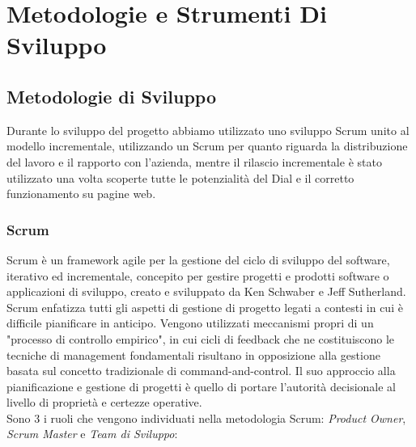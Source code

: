 
\chapter{Metodologie e Strumenti Di Sviluppo}
\label{chap:metod}
\section{Metodologie di Sviluppo}
Durante lo sviluppo del progetto abbiamo utilizzato uno sviluppo Scrum unito al modello incrementale, utilizzando un Scrum per quanto riguarda la distribuzione del lavoro e il rapporto con l'azienda, mentre il rilascio incrementale è stato utilizzato una volta scoperte tutte le potenzialità del Dial e il corretto funzionamento su pagine web.

\subsection{Scrum}
 
Scrum è un framework agile per la gestione del ciclo di sviluppo del software, iterativo ed incrementale, concepito per gestire progetti e prodotti software o applicazioni di sviluppo, creato e sviluppato da Ken Schwaber e Jeff Sutherland.\\

Scrum enfatizza tutti gli aspetti di gestione di progetto legati a contesti in cui è difficile pianificare in anticipo. Vengono utilizzati meccanismi propri di un "processo di controllo empirico", in cui cicli di feedback che ne costituiscono le tecniche di management fondamentali risultano in opposizione alla gestione basata sul concetto tradizionale di command-and-control. Il suo approccio alla pianificazione e gestione di progetti è quello di portare l'autorità decisionale al livello di proprietà e certezze operative.\\

Sono 3 i ruoli che vengono individuati nella metodologia Scrum: \emph{Product Owner}, \emph{Scrum Master} e \emph{Team di Sviluppo}:

